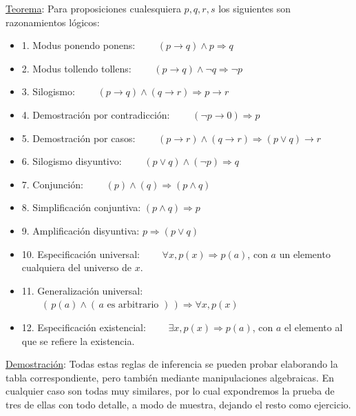 \underline{Teorema}: Para proposiciones cualesquiera $p, q, r, s$ los siguientes son razonamientos lógicos:

\begin{itemize}
\item 1. Modus ponendo ponens:    	$\qquad (p \to  q) \wedge p   \Rightarrow    q$ 

\item 2. Modus tollendo tollens:     $\qquad  (p \to  q) \wedge \neg q  \Rightarrow  \neg p$ 

\item 3. Silogismo:     $\qquad   (p\to q) \wedge (q\to r)  \Rightarrow   p\to r$ 

\item 4. Demostración por contradicción:   $\qquad  (\neg p \to  0)  \Rightarrow  p$ 

\item 5. Demostración por casos:   $\qquad (p\to r) \wedge (q \to r)    \Rightarrow   (p \vee q) \to r$ 

\item 6. Silogismo disyuntivo:  $\qquad (p \vee q) \wedge (\neg p)   \Rightarrow   q$ 

\item 7. Conjunción: $\qquad (p) \wedge (q)   \Rightarrow  (p \wedge q)$ 

\item 8. Simplificación conjuntiva: $( p \wedge q)  \Rightarrow p$ 

\item 9. Amplificación disyuntiva: $ p \Rightarrow  (p \vee q)$ 

\item 10.   Especificación universal: $\qquad \forall x, p(x) \Rightarrow p(a)$,  con $a$ un elemento cualquiera del universo de $x$. 

\item 11.   Generalización universal: $\qquad (\,p(a) \wedge (\, a \text{ es arbitrario })\,) \Rightarrow \forall x , p(x)$ 

\item 12.   Especificación existencial: $\qquad \exists x , p(x) \Rightarrow p(a)$, con $a$ el elemento al que se refiere la existencia. 
\end{itemize}

\underline{Demostración}: Todas estas reglas de inferencia se pueden probar elaborando la tabla correspondiente, pero también mediante manipulaciones algebraicas. En cualquier caso son todas muy similares, por lo cual expondremos la prueba de tres de ellas con todo detalle, a modo de muestra, dejando el resto como ejercicio.

